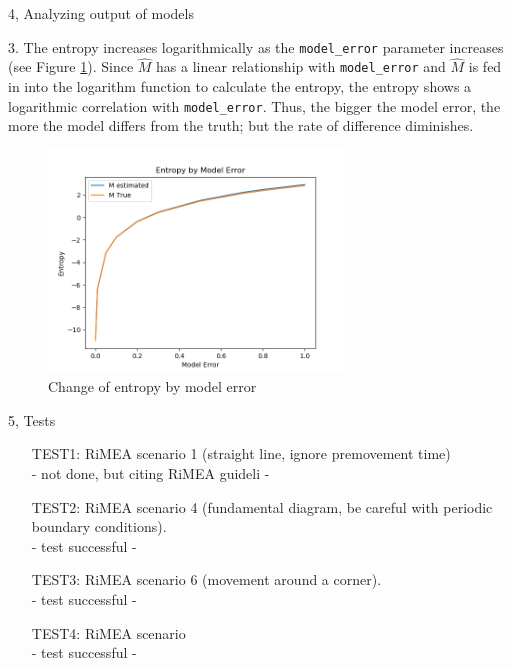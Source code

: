 \documentclass[10pt,a4paper]{article}
\begin{document}
\begin{task}{4, Analyzing output of models}

3. The entropy increases logarithmically as the \texttt{model\_error} parameter increases (see Figure \ref{fig:entropy_change_task4}). Since $\hat{M}$ has a linear relationship with \texttt{model\_error} and $\hat{M}$ is fed in into the logarithm function to calculate the entropy, the entropy shows a logarithmic correlation with \texttt{model\_error}. Thus, the bigger the model error, the more the model differs from the truth; but the rate of difference diminishes. 

\begin{figure}[H]
    \centering
    \includegraphics[width=0.7\textwidth]{pictures/task4_entropy.png}
    \caption{Change of entropy by model error}
    \label{fig:entropy_change_task4}
\end{figure}

\end{task}
\begin{task}{5, Tests}
\begin{enumerate}
\item[TEST1:] RiMEA scenario 1 (straight line, ignore premovement time)\\
- not done, but citing RiMEA guideli -
\item[TEST2:] RiMEA scenario 4 (fundamental diagram, be careful with periodic boundary conditions).\\
- test successful - 
\item[TEST3:] RiMEA scenario 6 (movement around a corner).\\
- test successful - 
\item[TEST4:] RiMEA scenario\\
- test successful - 
\end{enumerate}
\end{task}



\end{document}
